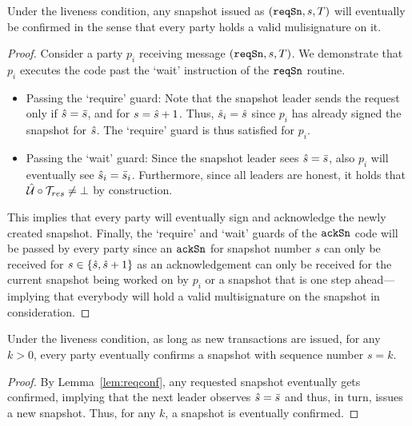 \begin{lemma}\label{lem:reqconf}  
  Under the liveness condition, any snapshot issued as $(\mathtt{reqSn},s,T)$ will eventually be confirmed
  in the sense that every party holds a valid mulisignature on it.
\end{lemma}
\begin{proof}
  Consider a party $p_i$ receiving message $(\mathtt{reqSn},s,T)$. We demonstrate that $p_i$ executes
  the code past the `wait' instruction of the $\mathtt{reqSn}$ routine. 

  \begin{itemize}
   \item Passing the `require' guard:
  Note that the snapshot leader sends the request only if $\hat s=\bar s$, and for $s=\hat s+1$.
  Thus, $\hat s_i=\hat s$ since $p_i$ has already signed the snapshot for $\hat s$. The `require'
  guard is thus satisfied for $p_i$.

   \item Passing the `wait' guard:
  Since the snapshot leader sees $\hat s=\bar s$, also $p_i$ will eventually see $\hat s_i=\bar s_i$. Furthermore, since all leaders are honest, it holds that $\hat {\mathcal U}\circ{\mathcal T}_{res}\not=\bot$ by construction.
  \end{itemize}

  This implies that every party will eventually sign and acknowledge the newly created snapshot.
  Finally, the `require' and `wait' guards of the $\mathtt{ackSn}$ code will be passed by every party
  since an $\mathtt{ackSn}$ for snapshot number $s$ can only be received for $s\in\{\hat s,\hat s+1\}$
  as an acknowledgement can only be received for the current snapshot being worked on by $p_i$
  or a snapshot that is one step ahead---implying that everybody will hold a valid multisignature
  on the snapshot in consideration.
\end{proof}

\begin{lemma}\label{lem:eternal}
  Under the liveness condition, as long as new transactions are issued, for any $k>0$, every party eventually confirms
  a snapshot with sequence number $s=k$.
\end{lemma}
\begin{proof}
  By Lemma~\ref{lem:reqconf}, any requested snapshot eventually gets confirmed, implying
  that the next leader observes $\hat s=\bar s$ and thus, in turn, issues a new snapshot.
  Thus, for any $k$, a snapshot is eventually confirmed.
\end{proof}

